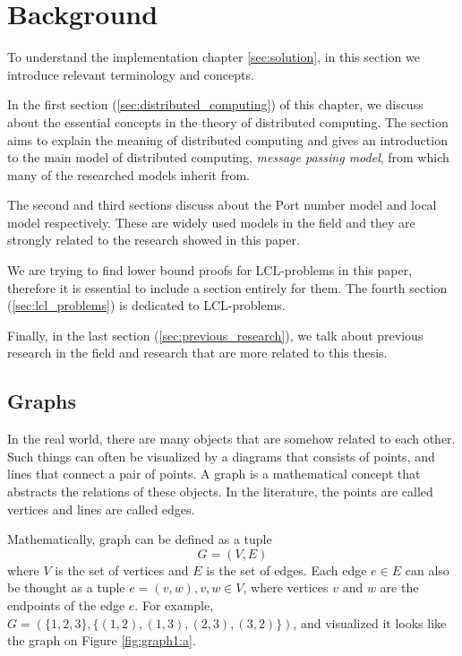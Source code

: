 \section{Background}
To understand the implementation chapter \ref{sec:solution}, in this section we introduce relevant terminology and concepts.


In the first section (\ref{sec:distributed_computing}) of this chapter, we discuss about the essential concepts in the theory of distributed computing.
The section aims to explain the meaning of distributed computing and gives an introduction to the main model of distributed computing, \emph{message passing model}, from which many of the researched models inherit from.

The second and third sections discuss about the Port number model and local model respectively.
These are widely used models in the field and they are strongly related to the research showed in this paper.

We are trying to find lower bound proofs for LCL-problems in this paper, therefore it is essential to include a section entirely for them.
The fourth section (\ref{sec:lcl_problems}) is dedicated to LCL-problems.

Finally, in the last section (\ref{sec:previous_research}), we talk about previous research in the field and research that are more related to this thesis.


\subsection{Graphs} \label{sec:graphs}
In the real world, there are many objects that are somehow related to each other.
Such things can often be visualized by a diagrams that consists of points, and lines that connect a pair of points.
A graph is a mathematical concept that abstracts the relations of these objects.
In the literature, the points are called vertices and lines are called edges.
\cite{DBLP:books/others/BondyM76}

Mathematically, graph can be defined as a tuple $$G = (V, E)$$ where $V$ is the set of vertices and $E$ is the set of edges.
Each edge $e \in E$ can also be thought as a tuple $e=(v, w), v, w \in V$, where vertices $v$ and $w$ are the endpoints of the edge $e$.
For example, $G=(\{1, 2, 3\}, \{(1, 2),(1, 3),(2, 3),(3, 2)\})$, and visualized it looks like the graph on Figure \ref{fig:graph1:a}.

